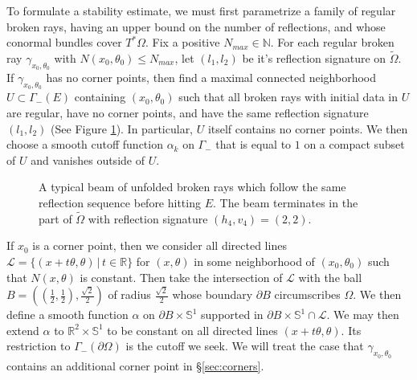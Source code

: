 \documentclass[10pt]{amsart}
\theoremstyle{definition}
\theoremstyle{definition}
\theoremstyle{definition}
\newcommand{ \rn }[1]{\mathbb{R}^{#1}}
\begin{document}
To formulate a stability estimate, we must first parametrize a family of regular broken rays, having an upper bound on the number of reflections, and whose conormal bundles cover $T^{*}\Omega$. Fix a positive $N_{max} \in \mathbb{N}$. For each regular broken ray $\gamma_{x_{0},\theta_{0}}$ with $N(x_{0},\theta_{0}) \leq N_{max}$, let $(l_{1},l_{2})$ be it's reflection signature on $\widetilde{\Omega}$. If $\gamma_{x_{0},\theta_{0}}$ has no corner points, then find a maximal connected neighborhood $U \subset \Gamma_{-}(E)$ containing $(x_{0},\theta_{0})$ such that all broken rays with initial data in $U$ are regular, have no corner points, and have the same reflection signature $(l_{1},l_{2})$ (See Figure \ref{fig:beam}). In particular, $U$ itself contains no corner points. We then choose a smooth cutoff function $\alpha_{k}$ on $\Gamma_{-}$ that is equal to $1$ on a compact subset of $U$ and vanishes outside of $U$. 

\begin{figure}
\centering
\def \svgwidth{0.6\columnwidth}

\caption{A typical beam of unfolded broken rays which follow the same reflection sequence before hitting $E$. The beam terminates in the part of $\widetilde{\Omega}$ with reflection signature $(h_{4},v_{4}) = (2,2)$.\label{fig:beam}}
\end{figure}

If $x_{0}$ is a corner point, then we consider all directed lines $\mathcal{L} = \{(x+t\theta,\theta) \, | \, t \in \mathbb{R}\}$ for $(x,\theta)$ in some neighborhood of $(x_{0},\theta_{0})$ such that $N(x,\theta)$ is constant. Then take the intersection of $\mathcal{L}$ with the ball $B = \left( \left( \frac{1}{2}, \frac{1}{2}\right), \frac{\sqrt{2}}{2} \right)$ of radius $\frac{\sqrt{2}}{2}$ whose boundary $\partial B$ circumscribes $\Omega$. We then define a smooth function $\alpha$ on $\partial B \times \mathbb{S}^{1}$ supported in $\partial B \times \mathbb{S}^{1} \cap \mathcal{L}$. We may then extend $\alpha$ to $\rn{2} \times \mathbb{S}^{1}$ to be constant on all directed lines $(x+t\theta, \theta)$. Its restriction to $\Gamma_{-}(\partial \Omega)$ is the cutoff we seek. We will treat the case that $\gamma_{x_{0},\theta_{0}}$ contains an additional corner point in \S \ref{sec:corners}. 
\end{document}
